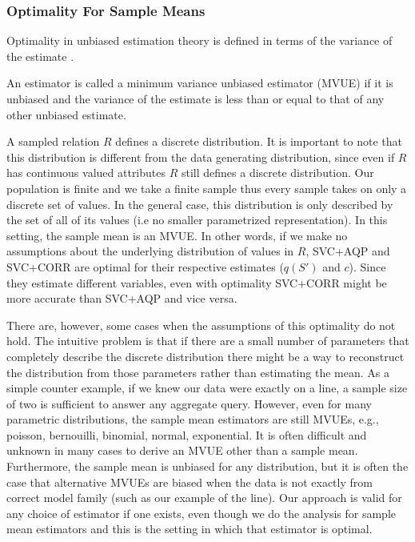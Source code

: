 \subsubsection{Optimality For Sample Means}
Optimality in unbiased estimation theory is defined in terms of the variance of the estimate \cite{cox1979theoretical}.
\begin{proposition}
An estimator is called a minimum variance unbiased estimator (MVUE) if it is unbiased and the variance of the estimate is less than or equal to that of any other unbiased estimate.
\end{proposition}

A sampled relation $R$ defines a discrete distribution. It is important to note that this distribution is different from the data generating distribution, since even if $R$ has continuous valued attributes $R$ still defines a discrete distribution. Our population is finite and we take a finite sample thus every sample takes on only a discrete set of values. In the general case, this distribution is only described by the set of all of its values (i.e no smaller parametrized representation). In this setting, the sample mean is an MVUE. In other words, if we make no assumptions about the underlying distribution of values in $R$, SVC+AQP and SVC+CORR are optimal for their respective estimates ($q(S')$ and $c$). Since they estimate different variables, even with optimality SVC+CORR might be more accurate than SVC+AQP and vice versa. 

There are, however, some cases when the assumptions of this optimality do not hold.
 The intuitive problem is that if there are a small number of parameters that completely describe the discrete distribution there might be a way to reconstruct the distribution from those parameters rather than estimating the mean. As a simple counter example, if we knew our data were exactly on a line, a sample size of two is sufficient to answer any aggregate query. However, even for many parametric distributions, the sample mean estimators are still MVUEs, e.g., poisson, bernouilli, binomial, normal, exponential. It is often difficult and unknown in many cases to derive an MVUE other than a sample mean. Furthermore, the sample mean is unbiased for any distribution, but it is often the case that alternative MVUEs are biased when the data is not exactly from correct model family (such as our example of the line). Our approach is valid for any choice of estimator if one exists, even though we do the analysis for sample mean estimators and this is the setting in which that estimator is optimal.

